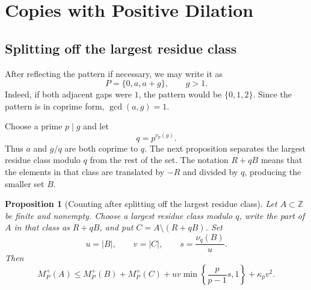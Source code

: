 \documentclass[11pt]{article}
\numberwithin{equation}{section}
\newtheorem{proposition}[proposition]{Proposition}
\theoremstyle{remark}
\newcommand{\Z}{\mathbb Z}
\begin{document}
\section{Copies with Positive Dilation}\label{sec:positive-d}
\subsection{Splitting off the largest residue class}
After reflecting the pattern if necessary, we may write it as
\begin{equation}\label{eq:pattern-right-gap}
 P=\{0,a,a+g\},\qquad g>1.
\end{equation}
Indeed, if both adjacent gaps were $1$, the pattern would be
$\{0,1,2\}$.  Since the pattern is in coprime form, $\gcd(a,g)=1$.

Choose a prime $p\mid g$ and let
\begin{equation}\label{eq:one-sided-q}
 q=p^{v_p(g)}.
\end{equation}
Thus $a$ and $g/q$ are both coprime to $q$.
The next proposition separates the largest residue class modulo $q$ from
the rest of the set.  The notation $R+qB$ means that the elements in that
class are translated by $-R$ and divided by $q$, producing the smaller set
$B$.
\begin{proposition}[Counting after splitting off the largest residue class]
\label{prop:largest-class-split}
Let $A\subset\Z$ be finite and nonempty.  Choose a largest residue class
modulo $q$, write the part of $A$ in that class as $R+qB$, and put
$C=A\setminus(R+qB)$.  Set
\[
 u=|B|,\qquad v=|C|,\qquad
 s=\frac{\nu_q(B)}u.
\]
Then
\begin{equation}\label{eq:largest-class-split}
 M_P^+(A)
 \le M_P^+(B)+M_P^+(C)
 +uv\min\left\{\frac{p}{p-1}s,1\right\}
 +\kappa_pv^2.
\end{equation}
\end{proposition}
\end{document}
